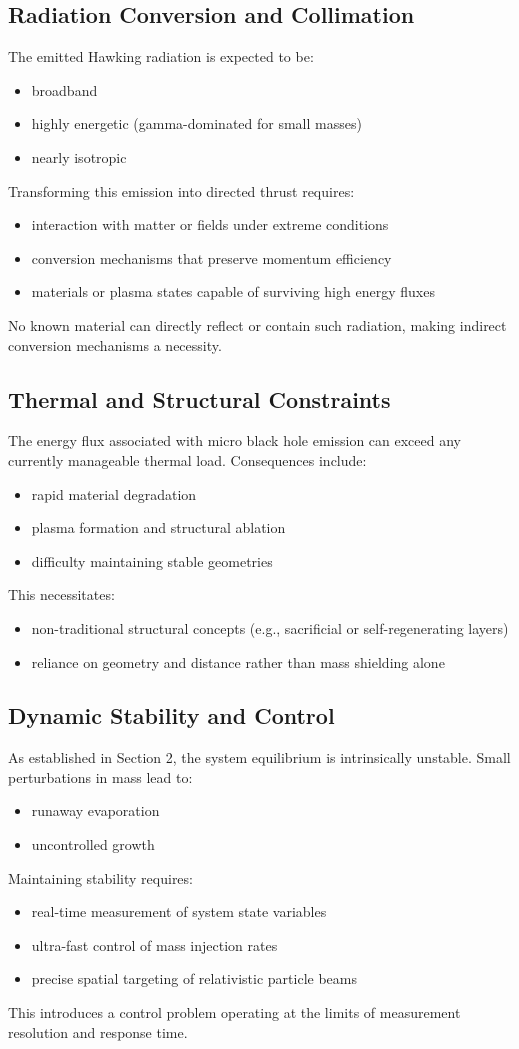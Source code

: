 \documentclass[conference]{IEEEtran}
\begin{document}
\subsection{Radiation Conversion and Collimation}
The emitted Hawking radiation is expected to be:
\begin{itemize}
\item broadband
\item highly energetic (gamma-dominated for small masses)
\item nearly isotropic
\end{itemize}
Transforming this emission into directed thrust requires:
\begin{itemize}
\item interaction with matter or fields under extreme conditions
\item conversion mechanisms that preserve momentum efficiency
\item materials or plasma states capable of surviving high energy fluxes
\end{itemize}
No known material can directly reflect or contain such radiation, making indirect conversion mechanisms a necessity.
\subsection{Thermal and Structural Constraints}
The energy flux associated with micro black hole emission can exceed any currently manageable thermal load. Consequences include:
\begin{itemize}
\item rapid material degradation
\item plasma formation and structural ablation
\item difficulty maintaining stable geometries
\end{itemize}
This necessitates:
\begin{itemize}
\item non-traditional structural concepts (e.g., sacrificial or self-regenerating layers)
\item reliance on geometry and distance rather than mass shielding alone
\end{itemize}
\subsection{Dynamic Stability and Control}
As established in Section 2, the system equilibrium is intrinsically unstable. Small perturbations in mass lead to:
\begin{itemize}
\item runaway evaporation
\item uncontrolled growth
\end{itemize}
Maintaining stability requires:
\begin{itemize}
\item real-time measurement of system state variables
\item ultra-fast control of mass injection rates
\item precise spatial targeting of relativistic particle beams
\end{itemize}
This introduces a control problem operating at the limits of measurement resolution and response time.
\end{document}
